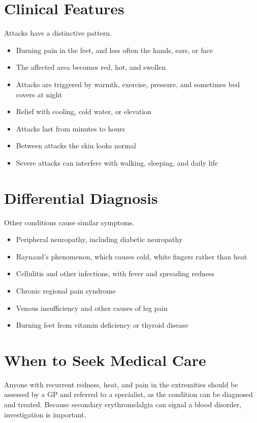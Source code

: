 \section*{Clinical Features}
Attacks have a distinctive pattern.
\begin{itemize}
    \item Burning pain in the feet, and less often the hands, ears, or face
    \item The affected area becomes red, hot, and swollen
    \item Attacks are triggered by warmth, exercise, pressure, and sometimes bed covers at night
    \item Relief with cooling, cold water, or elevation
    \item Attacks last from minutes to hours
    \item Between attacks the skin looks normal
    \item Severe attacks can interfere with walking, sleeping, and daily life
\end{itemize}

\section*{Differential Diagnosis}
Other conditions cause similar symptoms.
\begin{itemize}
    \item Peripheral neuropathy, including diabetic neuropathy
    \item Raynaud's phenomenon, which causes cold, white fingers rather than heat
    \item Cellulitis and other infections, with fever and spreading redness
    \item Chronic regional pain syndrome
    \item Venous insufficiency and other causes of leg pain
    \item Burning feet from vitamin deficiency or thyroid disease
\end{itemize}

\section*{When to Seek Medical Care}
Anyone with recurrent redness, heat, and pain in the extremities should be assessed by a GP and referred to a specialist, as the condition can be diagnosed and treated. Because secondary erythromelalgia can signal a blood disorder, investigation is important.

